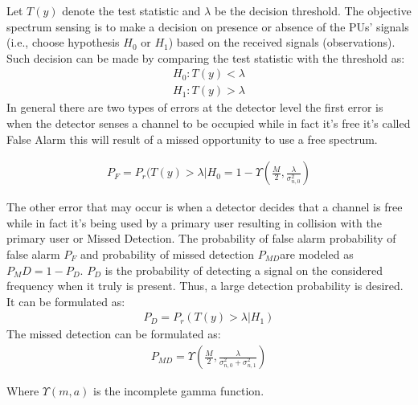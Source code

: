 \documentclass[twocolumn]{el-author}
\begin{document}
	Let $ T(y) $ denote the test statistic and $ \lambda $ be the decision threshold. The objective spectrum sensing is to make a decision on presence or absence of the PUs' signals (i.e., choose hypothesis $ H_0 $ or $ H_1 $) based on the received signals (observations). Such decision can be made by comparing the test statistic with the threshold as:
	\begin{align}\label{kondolies}
	H_0 : T(y)< \lambda
	\end{align}
	\begin{align}\label{kondolies}
	H_1 : T(y)> \lambda 
	\end{align}	
	In general there are two types of errors at the detector level the first error is when the detector senses a channel to be occupied while in fact it's free it's called False Alarm this will result of a missed opportunity to use a free spectrum.
	
	\begin{align}\label{kondolies}
	P_F= P_r (T(y)> \lambda|H_0 = 1-\Upsilon (\frac{M}{2},\frac{\lambda }{\sigma ^2_{n,0}})
	\end{align}
	
	
	The other error that may occur is when a detector decides that a channel is free while in fact it's being used by a primary user resulting in collision with the primary user or Missed Detection. The probability of false alarm probability of false alarm ${P} _ {F} $ and probability of missed detection ${P}_{MD }$are modeled as\cite{1447503} $P_MD=1-P_D $. $ P_D $ is the probability of detecting a signal on the considered frequency when it truly is present. Thus, a large detection probability is desired. It can be formulated as: 
	\begin{align}\label{kondolies}
	P_{D}= P_r (T(y)> \lambda|H_1)
	\end{align} 
	The missed detection can be formulated as: 
	\begin{align}\label{kondolies}
	P_{MD} = \Upsilon (\frac{M}{2},\frac{\lambda }{\sigma ^2_{n,0}+\sigma ^2_{n,1}})
	\end{align}	
	
	Where $\Upsilon (m,a)$ is the incomplete gamma function.
	
	
	
\end{document}
